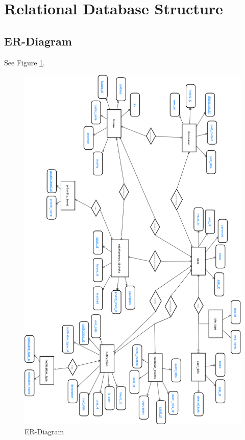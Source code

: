 \documentclass[12pt]{article}
\begin{document}
\section{Relational Database Structure}
\subsection{ER-Diagram}
See Figure \ref{fig:er}.
\begin{figure}[h]
  \includegraphics[scale=0.5, keepaspectratio]{images/ER_Diagram.png}
  \caption{ER-Diagram}
  \label{fig:er}
\end{figure}
\end{document}
